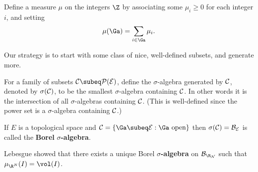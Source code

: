 \begin{ex}
Define a measure $\mu$ on the integers $\Z$ by associating some $\mu_i\geq 0$ for each integer $i$, and setting
\[
\mu(\Ga)=\sum_{i\in \Ga}\mu_i.
\]
\end{ex}

Our strategy is to start with some class of nice, well-defined subsets, and generate more.
\begin{df}
For a family of subsets $\cal C\subeq \cal P(E)$, define the
$\sigma$-algebra generated by $\cal C$, denoted by $\sigma(\cal C)$, to be the smallest $\sigma$-algebra containing $\cal C$. In other words it is the intersection of all $\sigma$-algebras containing $\cal C$. (This is well-defined since the power set is a $\sigma$-algebra containing $\cal C$.)

If $E$ is a topological space and $\cal C=\{\Ga\subeq E:\Ga\text{ open}\}$ then $\sigma(\cal C)=\cal B_E$ is called the \textbf{Borel }$\sigma$\textbf{-algebra}.
\end{df}
Lebesgue showed that there exists a unique Borel $\sigma$\textbf{-algebra} on $\cal B_{\R_N}$ such that $\mu_{\R^N}(I)=\vol(I)$. 

